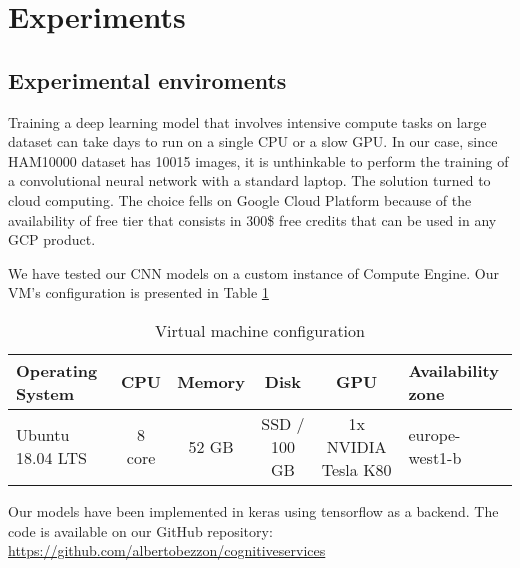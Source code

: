 \section{Experiments} \label{experiments}

	\subsection{Experimental enviroments}
	
		Training a deep learning model that involves intensive compute tasks on large dataset can take days to run on a single CPU or a slow GPU. In our case, since HAM10000 dataset has 10015 images, it is unthinkable to perform the training of a convolutional neural network with a standard laptop. The solution turned to cloud computing. The choice fells on Google Cloud Platform because of the availability of free tier that consists in 300\$ free credits that can be used in any GCP product. 
		
		\smallskip
		
		We have tested our CNN models on a custom instance of Compute Engine. Our VM’s configuration is presented in Table \ref{tab:hw-config}
		
		\begin{table}[H]
			\small
			\begin{tabular}{ |>{\centering\arraybackslash}p{2.5cm}|c|c|c|c|>{\centering\arraybackslash}p{2.5cm}| }
				\hline
				\textbf{Operating System} & \textbf{CPU} & \textbf{Memory} & \textbf{Disk} & \textbf{GPU} & \textbf{Availability zone} \\ \hline
				
				Ubuntu 18.04 LTS & 8 core & 52 GB & SSD / 100 GB & 1x NVIDIA Tesla K80 &  europe-west1-b\\ \hline
				
			\end{tabular}
			\caption{Virtual machine configuration}
			\label{tab:hw-config}
		\end{table}
	
		Our models have been implemented in keras using tensorflow as a backend. The code is available on our GitHub repository: \url{https://github.com/albertobezzon/cognitiveservices}
		
		